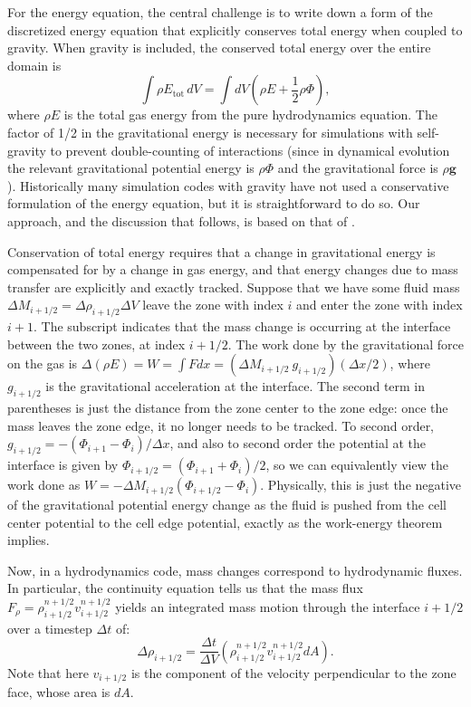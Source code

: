 \documentclass[iop,numberedappendix]{../emulateapj}
\begin{document}
For the energy equation, the central challenge is to write down a form of the 
discretized energy equation that explicitly conserves total energy when 
coupled to gravity. When gravity is included, the conserved total energy
over the entire domain is
\begin{equation}
  \int \rho E_{\text{tot}}\, dV = \int dV \left(\rho E + \frac{1}{2}\rho\Phi\right), \label{eq:total_energy_gravity}
\end{equation}
where $\rho E$ is the total gas energy from the pure hydrodynamics equation. 
The factor of 1/2 in the gravitational energy is necessary for simulations with
self-gravity to prevent double-counting of interactions (since in dynamical evolution
the relevant gravitational potential energy is $\rho \Phi$ and the gravitational force
is $\rho \mathbf{g}$). Historically many simulation codes with gravity have not used
a conservative formulation of the energy equation, but it is straightforward to do so.
Our approach, and the discussion that follows, is based on that of \cite{arepo}.

Conservation of total energy requires that a change in gravitational energy is compensated
for by a change in gas energy, and that energy changes due to mass transfer are explicitly and 
exactly tracked. Suppose that we have some fluid mass $\Delta M_{i+1/2} = \Delta \rho_{i+1/2} \Delta V$ leave the zone
with index $i$ and enter the zone with index $i+1$. The subscript indicates that the mass change is
occurring at the interface between the two zones, at index $i+1/2$. The work done by the gravitational
force on the gas is $\Delta (\rho E) = W = \int F dx = (\Delta M_{i+1/2}\ g_{i+1/2}) (\Delta x / 2)$,
where $g_{i+1/2}$ is the gravitational acceleration at the interface. The second term in parentheses
is just the distance from the zone center to the zone edge: once the mass leaves the zone edge, it no longer
needs to be tracked. To second order, $g_{i+1/2} = -(\Phi_{i+1} - \Phi_{i}) / \Delta x$, and also to second order the potential
at the interface is given by $\Phi_{i+1/2} = (\Phi_{i+1} + \Phi_i) / 2$, so we can equivalently view the work done
as $W = -\Delta M_{i+1/2} (\Phi_{i+1/2} - \Phi_i)$. Physically, this is just the negative of the gravitational
potential energy change as the fluid is pushed from the cell center potential to the cell edge potential,
exactly as the work-energy theorem implies. 

Now, in a hydrodynamics code, mass changes correspond to hydrodynamic fluxes. In particular,
the continuity equation tells us that the mass flux $F_\rho = \rho^{n+1/2}_{i+1/2} v^{n+1/2}_{i+1/2}$ yields
an integrated mass motion through the interface $i+1/2$ over a timestep $\Delta t$ of:
\begin{equation}
  \Delta \rho_{i+1/2} = \frac{\Delta t}{\Delta V} \left(\rho^{n+1/2}_{i+1/2} v^{n+1/2}_{i+1/2} dA\right).
\end{equation}
Note that here $v_{i+1/2}$ is the component of the velocity perpendicular to the zone face, whose
area is $dA$.
\end{document}
